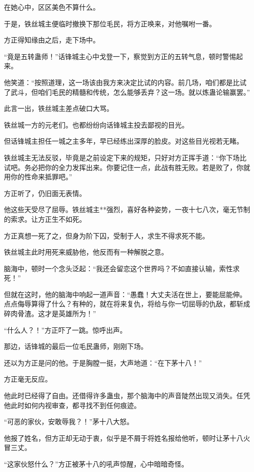 \begin{this_body}
在她心中，区区美色不算什么。

于是，铁丝城主便临时撤换下那位毛民，将方正唤来，对他嘱咐一番。

方正得知缘由之后，走下场中。

“竟是五转蛊师！”话锋城主心中戈登一下，察觉到方正的五转气息，顿时警惕起来。

他笑道：“按照道理，这一场该由我方来决定比试的内容。前几场，咱们都是比试了武斗，但咱们毛民的精髓和传统，怎么能够丢弃？这一场。就以炼蛊论输赢罢。”

此言一出，铁丝城主差点破口大骂。

铁丝城一方的元老们。也都纷纷向话锋城主投去鄙视的目光。

但话锋城主担任一城之主多年，早已经练出深厚的脸皮。对这些目光视若无睹。

铁丝城主无法反驳，毕竟是之前设定下来的规矩，只好对方正挥手道：“你下场比试吧。务必把你的全力发挥出来。你要记住一点，此战有胜无败。若是败了，你就用你的性命来抵罪吧。”

方正听了，仍旧面无表情。

他这些天受尽了屈辱。铁丝城主**强烈，喜好各种姿势，一夜十七八次，毫无节制的索求。让方正生不如死。

方正真想一死了之，但身为阶下囚，受制于人，求生不得求死不能。

铁丝城主此时用死来威胁他，他反而有一种解脱之意。

脑海中，顿时一个念头泛起：“我还会留恋这个世界吗？不如直接认输，索性求死！”

但就在这时，他的脑海中响起一道声音：“愚蠢！大丈夫活在世上，要能屈能伸。点点侮辱算得了什么？有种的，就在将来复仇，将给与你一切屈辱的仇敌，都斩成碎肉骨渣。这才是英雄所为！”

“什么人？！”方正吓了一跳。惊呼出声。

那边，话锋城的最后一位毛民蛊师，刚刚下场。

还以为方正是问的他。于是胸膛一挺，大声地道：“在下茅十八！”

方正毫无反应。

他此时已经得了自由。还借得许多蛊虫，那个脑海中的声音陡然出现又消失。任凭他此时如何内视审查，都寻找不到任何痕迹。

“可恶的家伙，安敢辱我？！”茅十八大怒。

他报了姓名，但方正却无动于衷，似乎是不屑于将姓名报给他听，顿时让茅十八火冒三丈。

“这家伙怒什么？”方正被茅十八的吼声惊醒，心中暗暗奇怪。


\end{this_body}
